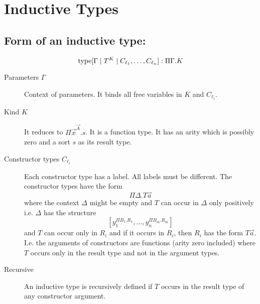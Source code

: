 \section {Inductive Types}


\subsection{Form of an inductive type:}
$$
    {\text{type}}[\Gamma \mid T^K \mid C_{\ell_1}, \ldots, C_{\ell_n}] : \Pi \Gamma. K
$$

\begin{description}
    \item [Parameters $\Gamma$] Context of parameters. It binds all free
        variables in $K$ and $C_{\ell_i}$.

    \item [Kind $K$] It reduces to $\Pi \vec x^{\vec A}. s$. It is a function
        type. It has an arity which is possibly zero and a sort $s$ as its
        result type.

    \item [Constructor types $C_{\ell_i}$] Each constructor type has a label.
        All labels must be different. The constructor types have the form
        $$
            \Pi \Delta. T \vec a
        $$
        where the context $\Delta$ might be empty and $T$ can occur in $\Delta$
        only positively i.e. $\Delta$ has the structure
        $$
            [y_1^{\Pi B_1. R_1}, \ldots, y_n^{\Pi B_m. R_m}]
        $$
        and $T$ can occur only in $R_i$ and if it occurs in $R_i$, then $R_i$
        has the form $T \vec a$. I.e. the arguments of constructors are
        functions (arity zero included) where $T$ occurs only in the result type
        and not in the argument types.

    \item [Recursive]
        An inductive type is recursively defined if $T$ occurs in the result
        type of any constructor argument.
\end{description}



